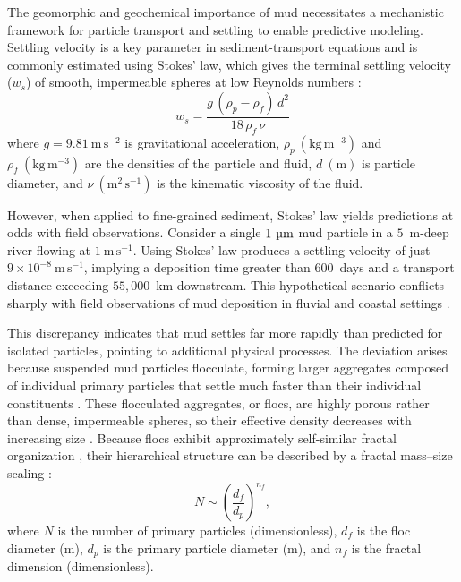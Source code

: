 \documentclass{agujournal2019}
\begin{document}
The geomorphic and geochemical importance of mud necessitates a mechanistic framework for particle transport and settling to enable predictive modeling. Settling velocity is a key parameter in sediment-transport equations and is commonly estimated using Stokes’ law, which gives the terminal settling velocity ($w_s$) of smooth, impermeable spheres at low Reynolds numbers \cite{bird2006transport, stokes1851effect}:
\begin{equation}
w_s = \frac{g\,(\rho_p - \rho_f)\,d^2}{18\,\rho_f\,\nu}
\label{eq:stokes}
\end{equation}
where $g = 9.81\ \mathrm{m\,s^{-2}}$ is gravitational acceleration, $\rho_p\ (\mathrm{kg\,m^{-3}})$ and $\rho_f\ (\mathrm{kg\,m^{-3}})$ are the densities of the particle and fluid, $d\ (\mathrm{m})$ is particle diameter, and $\nu\ (\mathrm{m^2\,s^{-1}})$ is the kinematic viscosity of the fluid.

However, when applied to fine-grained sediment, Stokes’ law yields predictions at odds with field observations. Consider a single $1~\text{\textmu m}$ mud particle in a $5$~m-deep river flowing at $1~\mathrm{m\,s^{-1}}$. Using Stokes’ law produces a settling velocity of just $9\times10^{-8}~\mathrm{m\,s^{-1}}$, implying a deposition time greater than $600$~days and a transport distance exceeding $55{,}000$~km downstream. This hypothetical scenario conflicts sharply with field observations of mud deposition in fluvial and coastal settings \cite{lamb2020mud, mason2019differential, nicholas1996significance}.

This discrepancy indicates that mud settles far more rapidly than predicted for isolated particles, pointing to additional physical processes. The deviation arises because suspended mud particles flocculate, forming larger aggregates composed of individual primary particles that settle much faster than their individual constituents \cite{droppo1997freshwater, johnson1996settling, kranenburg1994fractal}. These flocculated aggregates, or flocs, are highly porous rather than dense, impermeable spheres, so their effective density decreases with increasing size \cite{kranenburg1994fractal, Meakin1992Aggregation}. Because flocs exhibit approximately self-similar fractal organization \cite{family2012kinetics, jullien1987aggregation}, their hierarchical structure can be described by a fractal mass--size scaling \cite{Meakin1992Aggregation}:
\begin{equation}
N \sim \left( \frac{d_f}{d_p} \right)^{n_f},
\label{eq:fractaltheory}
\end{equation}
where $N$ is the number of primary particles (dimensionless), $d_f$ is the floc diameter (m), $d_p$ is the primary particle diameter (m), and $n_f$ is the fractal dimension (dimensionless).
\end{document}
